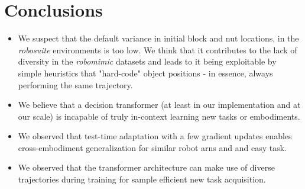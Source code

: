 \documentclass{article}
\begin{document}
\section{Conclusions}
\begin{itemize}
  \item We suspect that the default variance in initial block and nut locations, in the \textit{robosuite} environments is too low.
    We think that it contributes to the lack of diversity in the \textit{robomimic} datasets and leads to it being exploitable by simple heuristics that "hard-code" object positions - in essence, always performing the same trajectory.
  \item We believe that a decision transformer (at least in our implementation and at our scale) is incapable of truly in-context learning new tasks or embodiments.
  \item We observed that test-time adaptation with a few gradient updates enables cross-embodiment generalization for similar robot arns and and easy task.
  \item We observed that the transformer architecture can make use of diverse trajectories during training for sample efficient new task acquisition.
\end{itemize}
\end{document}

